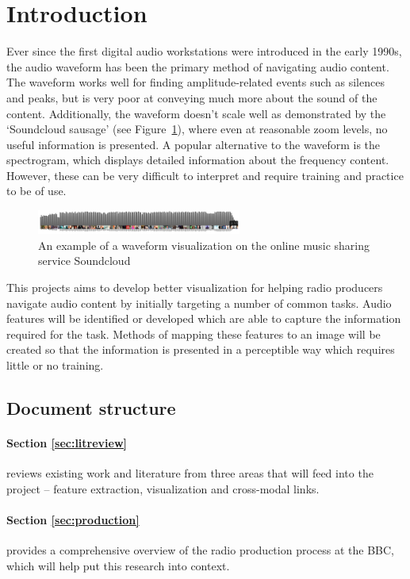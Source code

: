 \section{Introduction}\label{sec:intro}
Ever since the first digital audio workstations were introduced in the early
1990s, the audio waveform has been the primary method of navigating audio
content. The waveform works well for finding amplitude-related events such as
silences and peaks, but is very poor at conveying much more about the sound of
the content. Additionally, the waveform doesn't scale well as demonstrated by
the `Soundcloud sausage' (see Figure~\ref{fig:soundcloud}), where even at
reasonable zoom levels, no useful information is presented.  A popular
alternative to the waveform is the spectrogram, which displays detailed
information about the frequency content. However, these can be very difficult
to interpret and require training and practice to be of use.

\begin{figure}[ht]
  \centering
  \includegraphics[width=0.6\textwidth]{figs/soundcloud.png}
  \caption{An example of a waveform visualization on the online music sharing
    service Soundcloud}
  \label{fig:soundcloud}
\end{figure}

This projects aims to develop better visualization for helping radio producers
navigate audio content by initially targeting a number of common tasks. Audio
features will be identified or developed which are able to capture the
information required for the task. Methods of mapping these features to an
image will be created so that the information is presented in a perceptible way
which requires little or no training. 

\subsection{Document structure}

\paragraph{Section \ref{sec:litreview}} reviews existing work and literature
from three areas that will feed into the project -- feature extraction,
visualization and cross-modal links.

\paragraph{Section \ref{sec:production}} provides a comprehensive overview of
the radio production process at the BBC, which will help put this research into
context.

